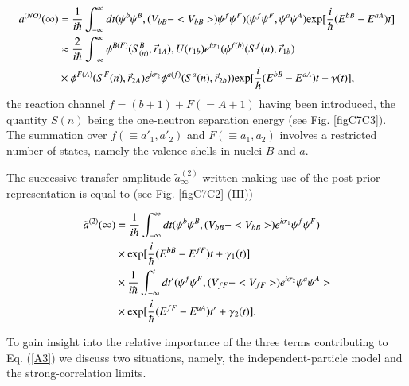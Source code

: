 \begin{subappendices}
\begin{equation}\label{eq7.C.6}
\begin{split}
a^{(NO)} (\infty) &= \frac{1}{i \hbar} \int^{\infty}_{-\infty} dt (\psi^b \psi^B, (V_{bB} - <V_{bB}>) \psi^f \psi^F )
(\psi^f\psi^F, \psi^a \psi^A) 
{\rm exp} [\frac{i}{\hbar} (E^{bB} - E^{aA}) t]    \\
&\approx \frac{2}{i \hbar} \int^{\infty}_{- \infty} \phi^{B(F)} (S^B_{(n)}, \vec r_{1A}), U(r_{1b}) 
e^{i \sigma_1}
(\phi^{f(b)}(S^f(n), \vec r_{1b})\\
&  \times\phi^{F(A)} (S^F(n),\vec r_{2A}) e^{i \sigma_2} \phi^{a(f)}(S^a(n),\vec r_{2b})) {\rm exp} [\frac{i}{\hbar} (E^{bB} - E^{aA}) t + \gamma(t)] ,
\end{split}
\end{equation}
the reaction channel $f= (b+1) + F(=A+1)$ having been introduced, the quantity $S(n)$ being the one-neutron separation 
energy (see Fig. \ref{figC7C3}). The summation over $f(\equiv a'_1,a'_2)$ and $F (\equiv a_1,a_2)$ involves a restricted number of states, namely the valence shells in nuclei $B$ and $a$.

The successive transfer amplitude  $\tilde a^{(2)}_{\infty}$ written making use of the post-prior representation is equal to 
(see Fig. \ref{figC7C2} (III))

\begin{align}\label{eqC7C7}
\nonumber \tilde a^{(2)} (\infty) & = \frac{1}{i \hbar} \int^{\infty}_{-\infty} dt (\psi^b \psi^B, (V_{bB} - <V_{bB}>) e^{i \sigma_1} \psi^f \psi^F )\\
 \nonumber &\times {\rm exp} [\frac{i}{\hbar} (E^{bB} - E^{fF}) t + \gamma_1(t)]   \\
\nonumber &\times \frac{1}{i \hbar} \int^{t}_{-\infty} dt' (\psi^f \psi^F, (V_{fF} - <V_{fF}>) e^{i \sigma_2} \psi^a \psi^A > \\
&\times {\rm exp} [\frac{i}{\hbar} (E^{fF} - E^{aA}) t' + \gamma_2(t)].
\end{align}

To gain insight into the  relative importance of the three terms contributing to Eq. (\ref{A3}) we discuss two situations, namely,
the independent-particle model and the strong-correlation limits. 



\end{subappendices}

